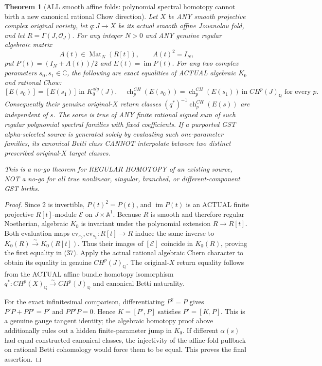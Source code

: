 \documentclass[11pt]{article}
\newtheorem{theorem}{Theorem}[section]
\begin{document}
\begin{theorem}[ALL smooth affine folds: polynomial spectral homotopy cannot birth a new canonical rational Chow direction]
Let $X$ be ANY smooth projective complex original variety,
let $q:J\to X$ be its actual smooth affine Jouanolou fold,
and let $R=\Gamma(J,\mathcal O_J)$.
For any integer $N>0$ and ANY genuine regular
algebraic matrix
\[
 \boxed{A(t)\in\operatorname{Mat}_N(R[t]),
          \qquad A(t)^2=I_N,}                            \tag{36}
\]
put $P(t)=(I_N+A(t))/2$ and
$E(t)=\operatorname{im}P(t)$.
For any two complex parameters $s_0,s_1\in\mathbb C$,
the following are exact equalities of ACTUAL algebraic
$K_0$ and rational Chow:
\[
 \boxed{
 [E(s_0)]=[E(s_1)]\ \text{in }K_0^{alg}(J),
 \quad
 \operatorname{ch}^{CH}_p(E(s_0))
 =\operatorname{ch}^{CH}_p(E(s_1))
   \ \text{in }CH^p(J)_{\mathbb Q}
 \text{ for every }p.}                                  \tag{37}
\]
Consequently their genuine original-$X$ return classes
$(q^*)^{-1}\operatorname{ch}^{CH}_p(E(s))$
are independent of $s$. The same is true of ANY
finite rational signed sum of such regular polynomial
spectral families with fixed coefficients.
If a purported GST alpha-selected source is generated
solely by evaluating such one-parameter families,
its canonical Betti class CANNOT interpolate between
two distinct prescribed original-$X$ target classes.

This is a no-go theorem for REGULAR HOMOTOPY of an
existing source, NOT a no-go for all true nonlinear,
singular, branched, or different-component GST births.
\end{theorem}
\begin{proof}
Since $2$ is invertible, $P(t)^2=P(t)$, and
$\operatorname{im}P(t)$ is an ACTUAL finite projective
$R[t]$-module $\mathcal E$ on $J\times\mathbb A^1$.
Because $R$ is smooth and therefore regular Noetherian,
algebraic $K_0$ is invariant under the polynomial
extension $R\to R[t]$. Both evaluation maps
$\mathrm{ev}_{s_0},\mathrm{ev}_{s_1}:R[t]\to R$
induce the same inverse to
$K_0(R)\xrightarrow{\sim}K_0(R[t])$.
Thus their images of $[\mathcal E]$ coincide
in $K_0(R)$, proving the first equality in (37).
Apply the actual rational algebraic Chern character
to obtain its equality in genuine $CH^p(J)_{\mathbb Q}$.
The original-$X$ return equality follows from the
ACTUAL affine bundle homotopy isomorphism
$q^*:CH^p(X)_{\mathbb Q}\xrightarrow{\sim}
CH^p(J)_{\mathbb Q}$ and canonical Betti naturality.

For the exact infinitesimal comparison, differentiating
$P^2=P$ gives $P'P+PP'=P'$ and $PP'P=0$.
Hence $K=[P',P]$ satisfies
$\boxed{P'=[K,P]}$.
This is a genuine gauge tangent identity;
the algebraic homotopy proof above additionally
rules out a hidden finite-parameter jump in $K_0$.
If different $\alpha(s)$ had equal constructed
canonical classes, the injectivity of the affine-fold
pullback on rational Betti cohomology would force them
to be equal. This proves the final assertion.
\end{proof}
\end{document}
